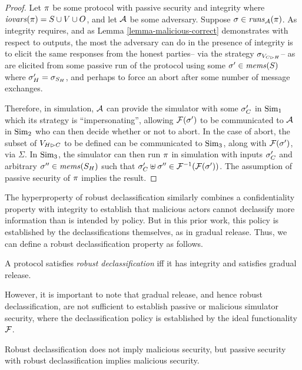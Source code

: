 \begin{proof}
  Let $\pi$ be some protocol with passive security and integrity
  where $\mathit{iovars}(\pi) = S \cup V \cup O$, and let $\mathcal{A}$ be some
  adversary. Suppose $\sigma \in \mathit{runs}_{\mathcal{A}}(\pi)$.
  As integrity requires, and as Lemma \ref{lemma-malicious-correct}
  demonstrates with respect to outputs, the most the adversary can do
  in the presence of integrity is to elicit the same responses from
  the honest parties-- via the strategy $\sigma_{V_{C \rhd H}}$-- as
  are elicited from some passive run of the protocol using
  some $\sigma' \in \mathit{mems}(S)$ where $\sigma'_H = \sigma_{S_H}$,
  and perhaps to force an abort after some number of message
  exchanges.

  Therefore, in simulation, $\mathcal{A}$ can provide the simulator
  with some $\sigma'_C$ in $\mathrm{Sim}_1$ which its strategy is ``impersonating'',
  allowing $\mathcal{F}(\sigma')$ to
  be communicated to $\mathcal{A}$ in $\mathrm{Sim}_2$ who can then
  decide whether or not to abort. In the case of abort, the
  subset of $V_{H \rhd C}$ to be defined can be communicated to
  $\mathrm{Sim}_3$, along with $\mathcal{F}(\sigma')$, via $\Sigma$. 
  In $\mathrm{Sim}_3$, the simulator can then run $\pi$ in simulation
  with inputs $\sigma'_C$ and arbitrary $\sigma'' \in \mathit{mems}(S_H)$
  such that $\sigma'_C \uplus \sigma'' \in \mathcal{F}^{-1}(\mathcal{F}(\sigma'))$.
  The assumption of passive security of $\pi$ implies the result.
\end{proof}

The hyperproperty of robust declassification \cite{930133} similarly
combines a confidentiality property with integrity to establish that
malicious actors cannot declassify more information than is intended
by policy. But in this prior work, this policy is established
by the declassifications themselves, as in gradual release.
Thus, we can define a robust declassification property as follows. 
\begin{definition}
  A protocol satisfies \emph{robust declassification} iff it has integrity and
  satisfies gradual release. 
\end{definition}
However, it is important to note that gradual release, and
hence robust declassification, are not sufficient to establish
passive or malicious simulator security, where the declassification
policy is established by the ideal functionality $\mathcal{F}$. 
\begin{theorem}
  Robust declassification does not imply malicious security, but
  passive security with robust declassification implies malicious security.
\end{theorem}

